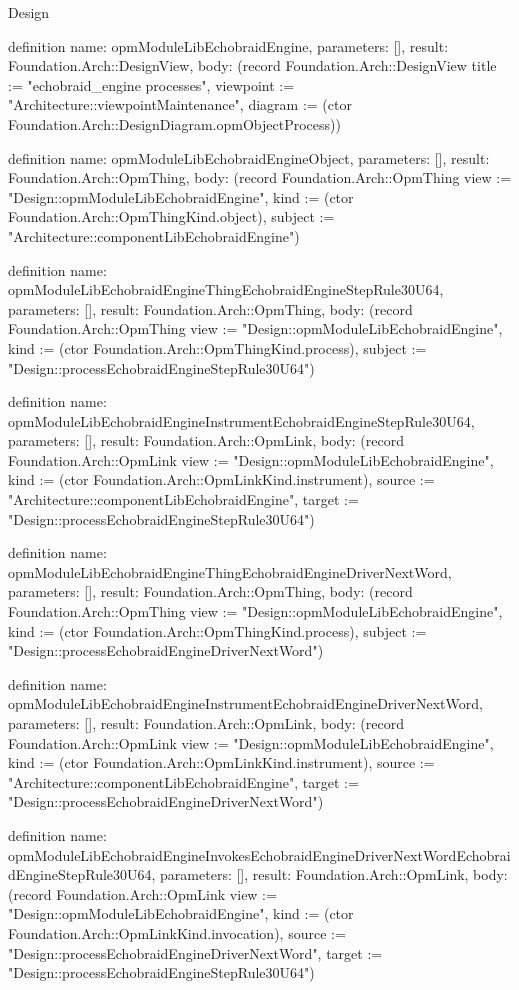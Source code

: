 \begin{lexlean}{Design}
\begin{semanticmodule}
definition{
  name: opmModuleLibEchobraidEngine,
  parameters: [],
  result: Foundation.Arch::DesignView,
  body: (record Foundation.Arch::DesignView {title := "echobraid_engine processes", viewpoint := "Architecture::viewpointMaintenance", diagram := (ctor Foundation.Arch::DesignDiagram.opmObjectProcess)})
}

definition{
  name: opmModuleLibEchobraidEngineObject,
  parameters: [],
  result: Foundation.Arch::OpmThing,
  body: (record Foundation.Arch::OpmThing {view := "Design::opmModuleLibEchobraidEngine", kind := (ctor Foundation.Arch::OpmThingKind.object), subject := "Architecture::componentLibEchobraidEngine"})
}

definition{
  name: opmModuleLibEchobraidEngineThingEchobraidEngineStepRule30U64,
  parameters: [],
  result: Foundation.Arch::OpmThing,
  body: (record Foundation.Arch::OpmThing {view := "Design::opmModuleLibEchobraidEngine", kind := (ctor Foundation.Arch::OpmThingKind.process), subject := "Design::processEchobraidEngineStepRule30U64"})
}

definition{
  name: opmModuleLibEchobraidEngineInstrumentEchobraidEngineStepRule30U64,
  parameters: [],
  result: Foundation.Arch::OpmLink,
  body: (record Foundation.Arch::OpmLink {view := "Design::opmModuleLibEchobraidEngine", kind := (ctor Foundation.Arch::OpmLinkKind.instrument), source := "Architecture::componentLibEchobraidEngine", target := "Design::processEchobraidEngineStepRule30U64"})
}

definition{
  name: opmModuleLibEchobraidEngineThingEchobraidEngineDriverNextWord,
  parameters: [],
  result: Foundation.Arch::OpmThing,
  body: (record Foundation.Arch::OpmThing {view := "Design::opmModuleLibEchobraidEngine", kind := (ctor Foundation.Arch::OpmThingKind.process), subject := "Design::processEchobraidEngineDriverNextWord"})
}

definition{
  name: opmModuleLibEchobraidEngineInstrumentEchobraidEngineDriverNextWord,
  parameters: [],
  result: Foundation.Arch::OpmLink,
  body: (record Foundation.Arch::OpmLink {view := "Design::opmModuleLibEchobraidEngine", kind := (ctor Foundation.Arch::OpmLinkKind.instrument), source := "Architecture::componentLibEchobraidEngine", target := "Design::processEchobraidEngineDriverNextWord"})
}

definition{
  name: opmModuleLibEchobraidEngineInvokesEchobraidEngineDriverNextWordEchobraidEngineStepRule30U64,
  parameters: [],
  result: Foundation.Arch::OpmLink,
  body: (record Foundation.Arch::OpmLink {view := "Design::opmModuleLibEchobraidEngine", kind := (ctor Foundation.Arch::OpmLinkKind.invocation), source := "Design::processEchobraidEngineDriverNextWord", target := "Design::processEchobraidEngineStepRule30U64"})
}


\end{semanticmodule}
\end{lexlean}
